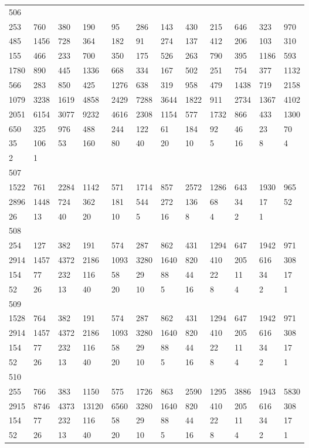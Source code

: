 \begin{longtable}{llllllllllll}
506&&&&&&&&&&&\\
253& 760& 380& 190& 95& 286& 143& 430& 215& 646& 323& 970\\
485& 1456& 728& 364& 182& 91& 274& 137& 412& 206& 103& 310\\
155& 466& 233& 700& 350& 175& 526& 263& 790& 395& 1186& 593\\
1780& 890& 445& 1336& 668& 334& 167& 502& 251& 754& 377& 1132\\
566& 283& 850& 425& 1276& 638& 319& 958& 479& 1438& 719& 2158\\
1079& 3238& 1619& 4858& 2429& 7288& 3644& 1822& 911& 2734& 1367& 4102\\
2051& 6154& 3077& 9232& 4616& 2308& 1154& 577& 1732& 866& 433& 1300\\
650& 325& 976& 488& 244& 122& 61& 184& 92& 46& 23& 70\\
35& 106& 53& 160& 80& 40& 20& 10& 5& 16& 8& 4\\
2& 1& \\

507&&&&&&&&&&&\\
1522& 761& 2284& 1142& 571& 1714& 857& 2572& 1286& 643& 1930& 965\\
2896& 1448& 724& 362& 181& 544& 272& 136& 68& 34& 17& 52\\
26& 13& 40& 20& 10& 5& 16& 8& 4& 2& 1& \\

508&&&&&&&&&&&\\
254& 127& 382& 191& 574& 287& 862& 431& 1294& 647& 1942& 971\\
2914& 1457& 4372& 2186& 1093& 3280& 1640& 820& 410& 205& 616& 308\\
154& 77& 232& 116& 58& 29& 88& 44& 22& 11& 34& 17\\
52& 26& 13& 40& 20& 10& 5& 16& 8& 4& 2& 1\\

509&&&&&&&&&&&\\
1528& 764& 382& 191& 574& 287& 862& 431& 1294& 647& 1942& 971\\
2914& 1457& 4372& 2186& 1093& 3280& 1640& 820& 410& 205& 616& 308\\
154& 77& 232& 116& 58& 29& 88& 44& 22& 11& 34& 17\\
52& 26& 13& 40& 20& 10& 5& 16& 8& 4& 2& 1\\

510&&&&&&&&&&&\\
255& 766& 383& 1150& 575& 1726& 863& 2590& 1295& 3886& 1943& 5830\\
2915& 8746& 4373& 13120& 6560& 3280& 1640& 820& 410& 205& 616& 308\\
154& 77& 232& 116& 58& 29& 88& 44& 22& 11& 34& 17\\
52& 26& 13& 40& 20& 10& 5& 16& 8& 4& 2& 1\\


\end{longtable}
